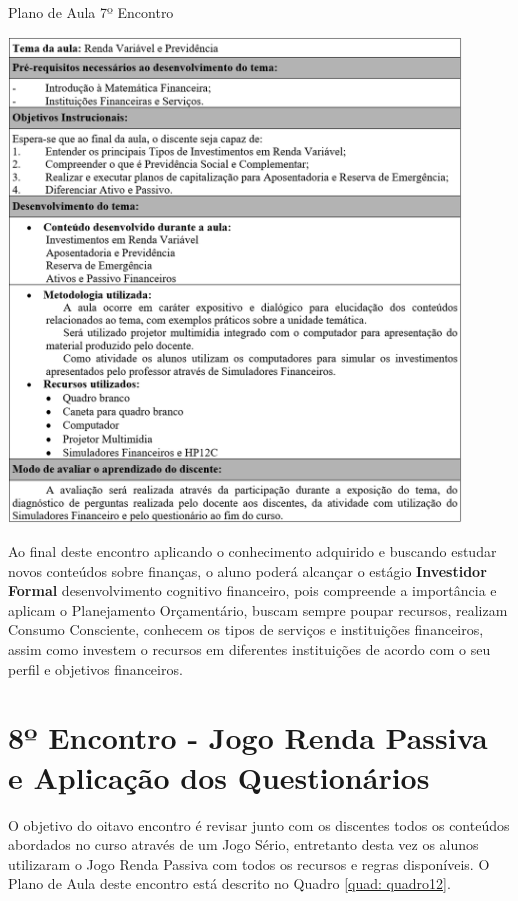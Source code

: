 \graphicspath{{quadros/}} 
\begin{quadro}[!ht]
\centering
\begin{minipage}{1.\textwidth}
\caption{Plano de Aula 7º Encontro}
\centering
\includegraphics[width=0.9\textwidth]{quadro-11_plano-aula-7}
\label{quad: quadro11}
\end{minipage}
\end{quadro}

Ao final deste encontro aplicando o conhecimento adquirido e buscando estudar novos conteúdos sobre finanças, o aluno poderá alcançar o estágio \textbf{Investidor Formal} desenvolvimento cognitivo financeiro, pois compreende a importância e aplicam o Planejamento Orçamentário, buscam sempre poupar recursos, realizam Consumo Consciente, conhecem os tipos de serviços e instituições financeiros, assim como investem o recursos em diferentes instituições de acordo com o seu perfil e objetivos financeiros.

\section{8º Encontro - Jogo Renda Passiva e Aplicação dos Questionários}
O objetivo do oitavo encontro é revisar junto com os discentes todos os conteúdos abordados no curso através de um Jogo Sério, entretanto desta vez os alunos utilizaram o Jogo Renda Passiva com todos os recursos e regras disponíveis. O Plano de Aula deste encontro está descrito no Quadro \ref{quad: quadro12}.

